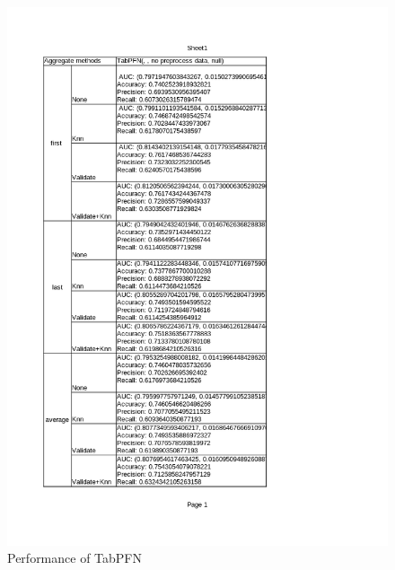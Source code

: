 \documentclass[../main.tex]{subfiles}
\begin{document}
 \begin{figure}[H]
    \centering
    \includegraphics[width=\textwidth]{Figure/KidneyResultNoLimit_TabPFN.png}
    \caption{Performance of TabPFN}
    \label{fig:KidneyResultNoLimit_TabPFN}
\end{figure}
\end{document}
